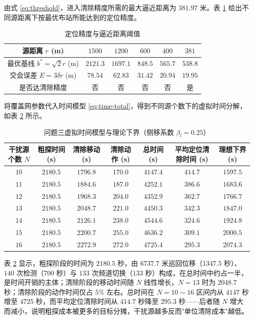 \documentclass[12pt,a4paper]{ctexart}
\begin{document}
由式 \eqref{eq:threshold}，进入清除精度所需的最大逼近距离为 $381.97$ 米。表 \ref{tab:p3-thr} 给出不同源距离下按最优布站所能达到的定位精度。

\begin{table}[H]
  \centering
  \caption{定位精度与逼近距离阈值}
  \label{tab:p3-thr}
  \begin{tabular}{cccccc}
    \toprule
    源距离 $r$ (m) & $1500$ & $1200$ & $600$ & $400$ & $381$ \\
    \midrule
    最优基线 $b^*=\sqrt2r$ (m) & $2121.3$ & $1697.1$ & $848.5$ & $565.7$ & $538.8$ \\
    交会误差 $E=3\delta r$ (m) & $78.54$ & $62.83$ & $31.42$ & $20.94$ & $19.95$ \\
    是否达清除精度 & 否 & 否 & 否 & 否 & 是 \\
    \bottomrule
  \end{tabular}
\end{table}

将覆盖网参数代入时间模型 \eqref{eq:time-total}，得到不同源个数下的虚拟时间分解，如表 \ref{tab:p3-time} 所示。

\begin{table}[H]
  \centering
  \caption{问题三虚拟时间模型与理论下界（侧移系数 $\beta_l=0.25$）}
  \label{tab:p3-time}
  \begin{tabular}{ccccccc}
    \toprule
    干扰源个数 $N$ & 粗探时间 (s) & 清除移动 (s) & 清除动作 (s) & 总时间 (s) & 平均定位清除时间 (s) & 理想下界 (s) \\
    \midrule
    $10$ & $2180.5$ & $1796.8$ & $170.0$ & $4147.4$ & $414.7$ & $1597.5$ \\
    $11$ & $2180.5$ & $1884.6$ & $187.0$ & $4252.1$ & $386.6$ & $1683.6$ \\
    $12$ & $2180.5$ & $1968.3$ & $204.0$ & $4352.9$ & $362.7$ & $1766.7$ \\
    $13$ & $2180.5$ & $2048.7$ & $221.0$ & $4450.3$ & $342.3$ & $1847.0$ \\
    $14$ & $2180.5$ & $2126.1$ & $238.0$ & $4544.6$ & $324.6$ & $1924.8$ \\
    $15$ & $2180.5$ & $2200.7$ & $255.0$ & $4636.2$ & $309.1$ & $2000.5$ \\
    $16$ & $2180.5$ & $2272.9$ & $272.0$ & $4725.4$ & $295.3$ & $2074.3$ \\
    \bottomrule
  \end{tabular}
\end{table}

表 \ref{tab:p3-time} 显示，粗探阶段的时间为 $2180.5$ 秒，由 $6737.7$ 米巡回位移（$1347.5$ 秒）、$140$ 次检测（$700$ 秒）与 $133$ 次频道切换（$133$ 秒）构成，在总时间中约占一半，是时间开销的主体；清除阶段的移动时间随 $N$ 线性增长，$N=13$ 时为 $2048.7$ 秒；清除阶段的动作时间仅占 $5\%$ 左右。总时间在 $N=10\sim16$ 区间内从 $4147$ 秒增至 $4725$ 秒，而平均定位清除时间从 $414.7$ 秒降至 $295.3$ 秒——后者随 $N$ 增大而减小，说明粗探成本被更多的目标分摊，干扰源越多反而"单位清除成本"越低。
\end{document}
